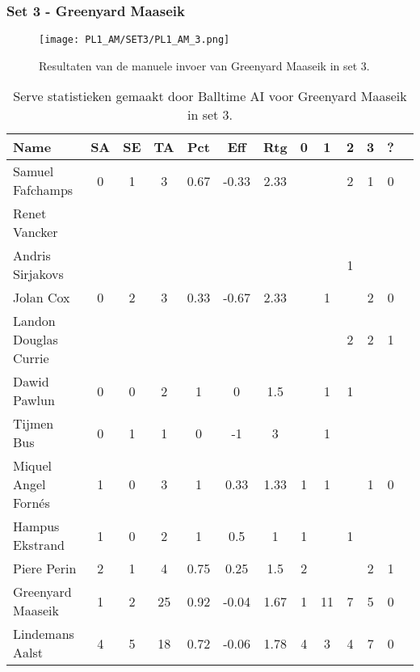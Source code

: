 \subsubsection{Set 3 - Greenyard Maaseik}
\label{sec:PL1_Greenyard3}
\begin{figure}
  \centering
  \texttt{[image: PL1\_AM/SET3/PL1\_AM\_3.png]}
  \caption{\label{fig:PL1_AM_3}Resultaten van de manuele invoer van Greenyard Maaseik in set 3.}
\end{figure}

\begin{table}[ht!]
  \centering
  \scriptsize
  \begin{tabular}{|l|c|c|c|c|c|c|c|c|c|c|c|c|} \hline
    \textbf{Name} & SA & SE & TA & Pct & Eff & Rtg & 0 & 1 & 2 & 3 & ? \\ \hline
    Samuel Fafchamps & 0 & 1 & 3 & 0.67 & -0.33 & 2.33 &   &   & 2 & 1 & 0 \\
    Renet Vancker &   &   &   &   &   &   &   &   &   &   &   \\
    Andris Sirjakovs &   &   &   &   &   &   &   &   & 1 &   &   \\
    Jolan Cox & 0 & 2 & 3 & 0.33 & -0.67 & 2.33 &   & 1 &   & 2 & 0 \\
    Landon Douglas Currie &   &   &   &   &   &   &   &   & 2 & 2 & 1 \\
    Dawid Pawlun & 0 & 0 & 2 & 1 & 0 & 1.5 &   & 1 & 1 &   &   \\
    Tijmen Bus & 0 & 1 & 1 & 0 & -1 & 3 &   & 1 &   &   &   \\
    Miquel Angel Fornés & 1 & 0 & 3 & 1 & 0.33 & 1.33 & 1 & 1 &   & 1 & 0 \\
    Hampus Ekstrand & 1 & 0 & 2 & 1 & 0.5 & 1 & 1 &   & 1 &   &   \\
    Piere Perin & 2 & 1 & 4 & 0.75 & 0.25 & 1.5 & 2 &   &   & 2 & 1 \\
    Greenyard Maaseik & 1 & 2 & 25 & 0.92 & -0.04 & 1.67 & 1 & 11 & 7 & 5 & 0 \\
    Lindemans Aalst & 4 & 5 & 18 & 0.72 & -0.06 & 1.78 & 4 & 3 & 4 & 7 & 0 \\ \hline
  \end{tabular}
  \caption[Serve statistieken gemaakt door Balltime AI voor Greenyard Maaseik in set 3]{\label{tab:PL1ServeGreenyard3}Serve statistieken gemaakt door Balltime AI voor Greenyard Maaseik in set 3.}
\end{table}

